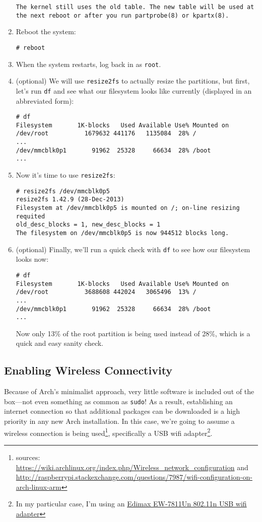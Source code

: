 \documentclass[12pt,letterpaper]{article}
\newcommand\styledhref[2]{\href{#1}{\sf #2}}
\begin{document}
\begin{enumerate}
\begin{lstlisting}
The kernel still uses the old table. The new table will be used at the next reboot or after you run partprobe(8) or kpartx(8).
\end{lstlisting}

\item Reboot the system:
\begin{lstlisting}
# reboot
\end{lstlisting}

\item When the system restarts, log back in as \lstinline{root}.

\item (optional) We will use \lstinline{resize2fs} to actually resize the partitions, but first, let's run \lstinline{df} and see what our filesystem looks like currently (displayed in an abbreviated form):
\begin{lstlisting}[basicstyle=\ttfamily\scriptsize]
# df
Filesystem       1K-blocks   Used Available Use% Mounted on
/dev/root          1679632 441176   1135084  28% /
...
/dev/mmcblk0p1       91962  25328     66634  28% /boot
...
\end{lstlisting}

\item Now it's time to use \lstinline{resize2fs}:
\begin{lstlisting}
# resize2fs /dev/mmcblk0p5
resize2fs 1.42.9 (28-Dec-2013)
Filesystem at /dev/mmcblk0p5 is mounted on /; on-line resizing requited
old_desc_blocks = 1, new_desc_blocks = 1
The filesystem on /dev/mmcblk0p5 is now 944512 blocks long.
\end{lstlisting}

\item (optional) Finally, we'll run a quick check with \lstinline{df} to see how our filesystem looks now:
\begin{lstlisting}[basicstyle=\ttfamily\scriptsize]
# df
Filesystem       1K-blocks   Used Available Use% Mounted on
/dev/root          3688608 442024   3065496  13% /
...
/dev/mmcblk0p1       91962  25328     66634  28% /boot
...
\end{lstlisting}
Now only 13\% of the root partition is being used instead of 28\%, which is a quick and easy sanity check.
\end{enumerate}

\subsection{Enabling Wireless Connectivity}
Because of Arch's minimalist approach, very little software is included out of the box---not even something as common as \lstinline{sudo}!  As a result, establishing an internet connection so that additional packages can be downloaded is a high priority in any new Arch installation.  In this case, we're going to assume a wireless connection is being used\footnote{sources: \url{https://wiki.archlinux.org/index.php/Wireless_network_configuration} and \url{http://raspberrypi.stackexchange.com/questions/7987/wifi-configuration-on-arch-linux-arm}}, specifically a USB wifi adapter\footnote{In my particular case, I'm using an \styledhref{http://lmgtfy.com/?q=\%22Edimax+EW-7811Un\%22}{Edimax EW-7811Un 802.11n USB wifi adapter}}.
\end{document}
